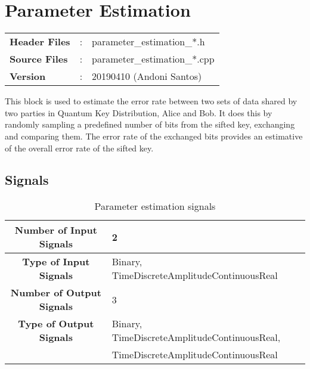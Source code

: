 \clearpage
\graphicspath{{./lib/parameter_estimation/figures/}}
\section{Parameter Estimation}

\begin{tcolorbox}	
	\begin{tabular}{p{2.75cm} p{0.2cm} p{10.5cm}} 	
        \textbf{Header Files}    &:& parameter\_estimation\_*.h \\
		\textbf{Source Files}    &:& parameter\_estimation\_*.cpp \\
        \textbf{Version}        &:& 20190410 (Andoni Santos)
	\end{tabular}
\end{tcolorbox}

\maketitle
This block is used to estimate the error rate between two sets of data shared
by two parties in Quantum Key Distribution, Alice and Bob. It does this by
randomly sampling a predefined number of bits from the sifted key, exchanging
and comparing them. The error rate of the exchanged bits provides an estimative
of the overall error rate of the sifted key. 


\subsection*{Signals}

\begin{table}[h]
	\begin{tabular}{|c|l|}
		\hline
		\textbf{Number of Input Signals} & 2 \\ \hline
        \textbf{Type of Input Signals} & Binary, TimeDiscreteAmplitudeContinuousReal \\ \hline
    	\textbf{Number of Output Signals} & 3 \ \\ \hline
        \textbf{Type of Output Signals} & Binary,
		TimeDiscreteAmplitudeContinuousReal,\\
		& TimeDiscreteAmplitudeContinuousReal \\ \hline
	\end{tabular}
	\caption{Parameter estimation signals}
	\label{table:par_est_signals}
\end{table}

